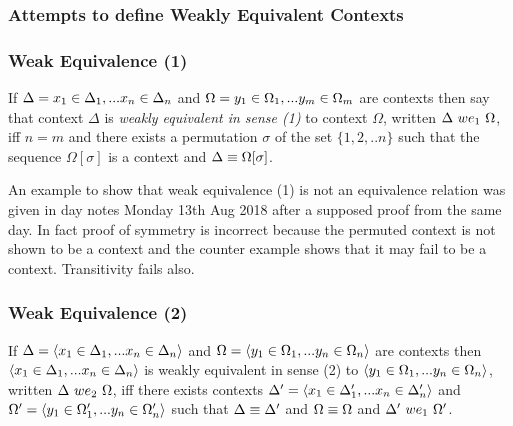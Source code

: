 \documentclass[10pt,a4paper]{scrartcl}
\begin{document}
\subsubsection{Attempts to define Weakly Equivalent Contexts}

\subsubsection{Weak Equivalence (1)}
\begin{definition}
If $\Delta = x_1 \in \Delta_1,... x_{n} \in \Delta_{n}$ and $\Omega=y_1 \in \Omega_1,... y_{m} \in \Omega_{m}$ are contexts then say that context $\Delta$
is \textit{weakly equivalent in sense (1) } to context $\Omega$, written $\Delta\ we_1\ \Omega$,  iff $n=m$ and there exists a permutation $\sigma$ of the set $\{1,2,..n\}$
such that the sequence $\Omega[\sigma]$ 
is a context and $\Delta \equiv \Omega[\sigma]$.
\end{definition}
\begin{framed}
An example to show that weak equivalence (1) is not an equivalence relation was given in day notes Monday 13th Aug 2018 after a supposed proof from the same day.
In fact proof of symmetry is incorrect because the permuted context is not shown to be a context and the counter example shows that
it may fail to be a context. Transitivity fails also. 
\end{framed}


\subsubsection{Weak Equivalence (2)}
\begin{definition}
If $\Delta=\langle x_1 \in \Delta_1,... x_{n} \in \Delta_{n}\rangle$ and $\Omega = \langle y_1 \in \Omega_1,... y_{n} \in \Omega_{n}\rangle$ are contexts then $\langle x_1 \in \Delta_1,... x_{n} \in \Delta_{n}\rangle$ is weakly equivalent in sense (2) to $\langle y_1 \in \Omega_1,... y_{n} \in \Omega_{n}\rangle$, written $\Delta\ we_2\ \Omega$, iff there exists contexts $\Delta' = \langle x_1 \in \Delta'_1,... x_{n} \in \Delta'_{n}\rangle$ and $\Omega' = \langle y_1 \in \Omega'_1,... y_{n} \in \Omega'_{n}\rangle$ such that
$\Delta \equiv \Delta'$ and $\Omega \equiv \Omega$ and $\Delta'\ we_1\ \Omega'$.
\end{definition}
\end{document}
